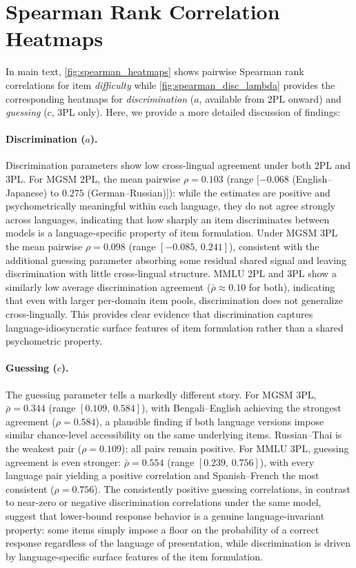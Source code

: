 \documentclass[11pt]{article}
\begin{document}
\section{Spearman Rank Correlation Heatmaps}
\label{app:heatmaps}

In main text, \autoref{fig:spearman_heatmaps} shows pairwise Spearman
rank correlations for item \emph{difficulty} while \autoref{fig:spearman_disc_lambda}
provides the corresponding heatmaps for \emph{discrimination} ($a$,
available from 2PL onward) and \emph{guessing} ($c$, 3PL only). Here, we provide a more detailed discussion of findings:

\paragraph{Discrimination ($a$).}Discrimination parameters show low cross-lingual agreement under both 2PL and 3PL. For MGSM 2PL, the mean pairwise $\rho = 0.103$
(range $[-0.068$ (English--Japanese) to $0.275$ (German--Russian)]):
while the estimates are positive and psychometrically meaningful within each language,
they do not agree strongly across languages, indicating that how sharply an item
discriminates between models is a language-specific property of item formulation.
Under MGSM 3PL the mean pairwise $\rho = 0.098$ (range $[-0.085,\, 0.241]$),
consistent with the additional guessing parameter absorbing some residual shared
signal and leaving discrimination with little cross-lingual structure.
MMLU 2PL and 3PL show a similarly low average discrimination agreement
($\bar{\rho} \approx 0.10$ for both), indicating that even with larger per-domain
item pools, discrimination does not generalize cross-lingually.
This provides clear evidence that discrimination captures language-idiosyncratic
surface features of item formulation rather than a shared psychometric property.

\paragraph{Guessing ($c$).}
The guessing parameter tells a markedly different story.
For MGSM 3PL, $\bar{\rho} = 0.344$ (range $[0.109,\, 0.584]$), with
Bengali--English achieving the strongest agreement ($\rho = 0.584$),
a plausible finding if both language versions impose similar chance-level
accessibility on the same underlying items.
Russian--Thai is the weakest pair ($\rho = 0.109$); all pairs remain positive.
For MMLU 3PL, guessing agreement is even stronger:
$\bar{\rho} = 0.554$ (range $[0.239,\, 0.756]$), with every language
pair yielding a positive correlation and Spanish--French the most
consistent ($\rho = 0.756$).
The consistently positive guessing correlations, in contrast to near-zero
or negative discrimination correlations under the same model, suggest that
lower-bound response behavior is a genuine language-invariant property: some items simply impose a floor on the probability of a correct
response regardless of the language of presentation, while discrimination
is driven by language-specific surface features of the item formulation.
\end{document}

